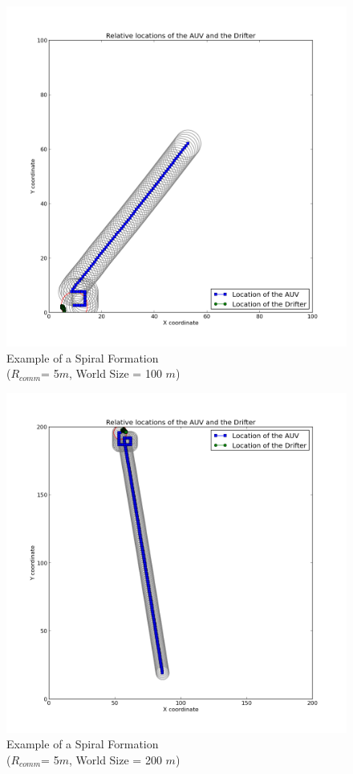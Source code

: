 \documentclass[a4paper, 11pt]{article} %
\begin{document}
\begin{figure}[H]
	\begin{center}
		\includegraphics[scale=0.30]{example_spiral_1.png}
	\end{center}
\caption{Example of a Spiral Formation\\ ($R_{comm}$= 5$m$, World Size = 100 $m$) \label{exampleSpiral100}}
\end{figure}

\begin{figure}[H]
	\begin{center}
		\includegraphics[scale=0.30]{example_spiral_2.png}
	\end{center}
\caption{Example of a Spiral Formation\\ ($R_{comm}$= 5$m$, World Size = 200 $m$) \label{exampleSpiral200}}
\end{figure}
\end{document}
